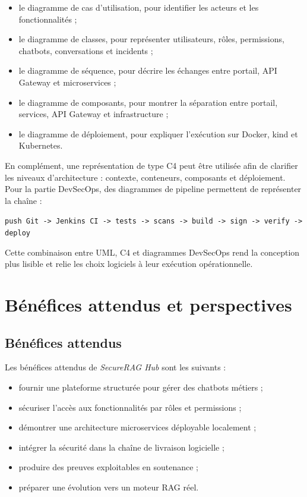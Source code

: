 \begin{itemize}
    \item le diagramme de cas d'utilisation, pour identifier les acteurs et les fonctionnalités ;
    \item le diagramme de classes, pour représenter utilisateurs, rôles, permissions, chatbots, conversations et incidents ;
    \item le diagramme de séquence, pour décrire les échanges entre portail, API Gateway et microservices ;
    \item le diagramme de composants, pour montrer la séparation entre portail, services, API Gateway et infrastructure ;
    \item le diagramme de déploiement, pour expliquer l'exécution sur Docker, kind et Kubernetes.
\end{itemize}

En complément, une représentation de type C4 peut être utilisée afin de clarifier les niveaux d'architecture : contexte, conteneurs, composants et déploiement. Pour la partie DevSecOps, des diagrammes de pipeline permettent de représenter la chaîne :

\begin{center}
\texttt{push Git -> Jenkins CI -> tests -> scans -> build -> sign -> verify -> deploy}
\end{center}

Cette combinaison entre UML, C4 et diagrammes DevSecOps rend la conception plus lisible et relie les choix logiciels à leur exécution opérationnelle.

\section{Bénéfices attendus et perspectives}

\subsection{Bénéfices attendus}

Les bénéfices attendus de \textit{SecureRAG Hub} sont les suivants :

\begin{itemize}
    \item fournir une plateforme structurée pour gérer des chatbots métiers ;
    \item sécuriser l'accès aux fonctionnalités par rôles et permissions ;
    \item démontrer une architecture microservices déployable localement ;
    \item intégrer la sécurité dans la chaîne de livraison logicielle ;
    \item produire des preuves exploitables en soutenance ;
    \item préparer une évolution vers un moteur RAG réel.
\end{itemize}

